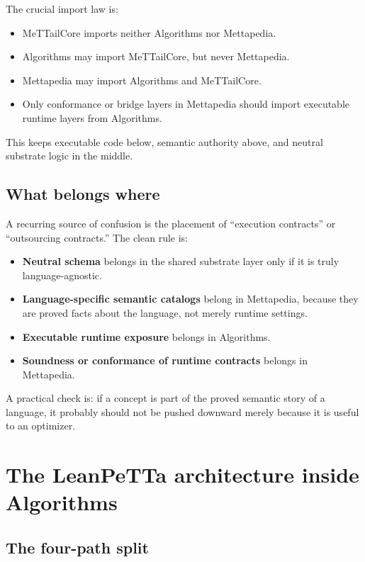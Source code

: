 \documentclass[11pt]{article}
\begin{document}
The crucial import law is:

\begin{itemize}
  \item MeTTailCore imports neither Algorithms nor Mettapedia.
  \item Algorithms may import MeTTailCore, but never Mettapedia.
  \item Mettapedia may import Algorithms and MeTTailCore.
  \item Only conformance or bridge layers in Mettapedia should import executable runtime layers from Algorithms.
\end{itemize}

This keeps executable code below, semantic authority above, and neutral substrate logic in the middle.

\subsection{What belongs where}

A recurring source of confusion is the placement of ``execution contracts'' or ``outsourcing contracts.'' The clean rule is:

\begin{itemize}
  \item \textbf{Neutral schema} belongs in the shared substrate layer only if it is truly language-agnostic.
  \item \textbf{Language-specific semantic catalogs} belong in Mettapedia, because they are proved facts about the language, not merely runtime settings.
  \item \textbf{Executable runtime exposure} belongs in Algorithms.
  \item \textbf{Soundness or conformance of runtime contracts} belongs in Mettapedia.
\end{itemize}

A practical check is: if a concept is part of the proved semantic story of a language, it probably should not be pushed downward merely because it is useful to an optimizer.

\section{The LeanPeTTa architecture inside Algorithms}

\subsection{The four-path split}
\end{document}
